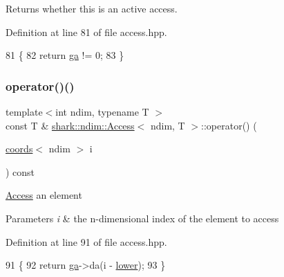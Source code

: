 Returns whether this is an active access. 

Definition at line 81 of file access.\+hpp.


\begin{DoxyCode}
81                                                    \{
82             \textcolor{keywordflow}{return} \hyperlink{classshark_1_1ndim_1_1_access_abc59e261a07fcecc3f1db641ef04efa7}{ga} != 0;
83         \}
\end{DoxyCode}
\hypertarget{classshark_1_1ndim_1_1_access_a3f9cceefe7a04c4e50c6f96de0296a15}{}\label{classshark_1_1ndim_1_1_access_a3f9cceefe7a04c4e50c6f96de0296a15} 
\subsubsection{\texorpdfstring{operator()()}{operator()()}\hspace{0.1cm}{\footnotesize\ttfamily [1/2]}}
{\footnotesize\ttfamily template$<$int ndim, typename T $>$ \\
const T \& \hyperlink{classshark_1_1ndim_1_1_access}{shark\+::ndim\+::\+Access}$<$ ndim, T $>$\+::operator() (\begin{DoxyParamCaption}\item[{\hyperlink{structshark_1_1ndim_1_1coords}{coords}$<$ ndim $>$}]{i }\end{DoxyParamCaption}) const\hspace{0.3cm}{\ttfamily [inline]}}

\hyperlink{classshark_1_1ndim_1_1_access}{Access} an element 
\begin{DoxyParams}{Parameters}
{\em i} & the n-\/dimensional index of the element to access \\
\hline
\end{DoxyParams}


Definition at line 91 of file access.\+hpp.


\begin{DoxyCode}
91                                                                        \{
92             \textcolor{keywordflow}{return} \hyperlink{classshark_1_1ndim_1_1_access_abc59e261a07fcecc3f1db641ef04efa7}{ga}->da(i - \hyperlink{classshark_1_1ndim_1_1_access_ac1e92dba307ff877963c94bd42fcbafb}{lower});
93         \}
\end{DoxyCode}
\hypertarget{classshark_1_1ndim_1_1_access_a67b1107ce87e39d19e2112e26f2f15c5}{}\label{classshark_1_1ndim_1_1_access_a67b1107ce87e39d19e2112e26f2f15c5} 
